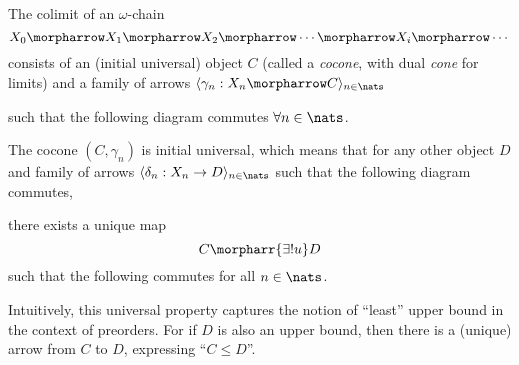 \begin{definition}
The colimit of an $\omega$-chain
\[
    X_0 \morpharrow X_1 \morpharrow X_2 \morpharrow \cdots \morpharrow X_i
    \morpharrow \cdots
\]
consists of an (initial universal) object $C$ (called a \emph{cocone}, with dual
\emph{cone} for limits) and a family of arrows $\langle \gamma_n : X_n
\morpharrow C \rangle _{n \in \nats}$

\begin{center}
\end{center}

such that the following diagram commutes $\forall n \in \nats$.

\begin{center}
\end{center}

The cocone $(C, \gamma_n)$ is initial universal, which means that for any other
object $D$ and family of arrows
$\langle \delta_n : X_n \rightarrow D\rangle_{n \in \nats}$ such that the
following diagram commutes,
\begin{center}
\end{center}

there exists a unique map
\[
    C \morpharr{\exists ! u} D
\]
such that the following commutes for all $n \in \nats$.
\begin{center}
\end{center}

Intuitively, this universal property captures the notion of ``least'' upper
bound in the context of preorders. For if $D$ is also an upper bound, then there
is a (unique) arrow from $C$ to $D$, expressing ``$C \leq D$''.

\end{definition}

